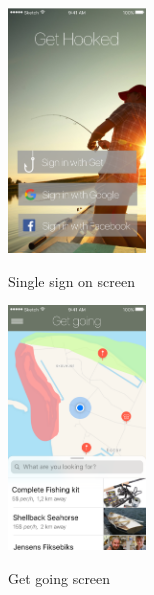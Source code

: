 \begin{figure}[t!]
  \centering
  \hfill
  \begin{subfigure}[t]{0.2\textwidth}
  	  \centering
  	  \includegraphics[width=0.4\textwidth]{images/Introscreen.png}
  	  \label{fig:f1}
  	  \caption{Single sign on screen}
  \end{subfigure}
  \hfill
  \begin{subfigure}[t]{0.2\textwidth}
  	  \centering
  	  \includegraphics[width=0.4\textwidth]{images/Map.png}
  	  \label{fig:f2}
   	  \caption{Get going screen}
  \end{subfigure}
  \hfill
  \begin{subfigure}[t]{0.2\textwidth}
  	  \centering

\end{subfigure}
\end{figure}
